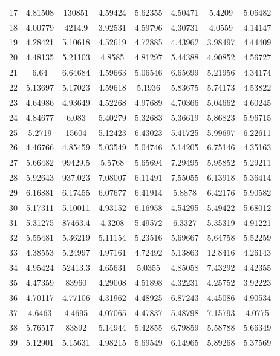 \begin{figure}
\begin{tabular}{cccccccc}
17 & 4.81508 & 130851 & 4.59424 & 5.62355 & 4.50471 & 5.4209 & 5.06482\\
18 & 4.00779 & 4214.9 & 3.92531 & 4.59796 & 4.30731 & 4.0559 & 4.14147\\
19 & 4.28421 & 5.10618 & 4.52619 & 4.72885 & 4.43962 & 3.98497 & 4.44409\\
20 & 4.48135 & 5.21103 & 4.8585 & 4.81297 & 5.44388 & 4.90852 & 4.56727\\
21 & 6.64 & 6.64684 & 4.59663 & 5.06546 & 6.65699 & 5.21956 & 4.34174\\
22 & 5.13697 & 5.17023 & 4.59618 & 5.1936 & 5.83675 & 5.74173 & 4.53822\\
23 & 4.64986 & 4.93649 & 4.52268 & 4.97689 & 4.70366 & 5.04662 & 4.60245\\
24 & 4.84677 & 6.083 & 5.40279 & 5.32683 & 5.36619 & 5.86823 & 5.96715\\
25 & 5.2719 & 15604 & 5.12423 & 6.43023 & 5.41725 & 5.99697 & 6.22611\\
26 & 4.46766 & 4.85459 & 5.03549 & 5.04746 & 5.14205 & 6.75146 & 4.35163\\
27 & 5.66482 & 99429.5 & 5.5768 & 5.65694 & 7.29495 & 5.95852 & 5.29211\\
28 & 5.92643 & 937.023 & 7.08007 & 6.11491 & 7.55055 & 6.13918 & 5.36414\\
29 & 6.16881 & 6.17455 & 6.07677 & 6.41914 & 5.8878 & 6.42176 & 5.90582\\
30 & 5.17311 & 5.10011 & 4.93152 & 6.16958 & 4.54295 & 5.49422 & 5.68012\\
31 & 5.31275 & 87463.4 & 4.3208 & 5.49572 & 6.3327 & 5.35319 & 4.91221\\
32 & 5.55481 & 5.36219 & 5.11154 & 5.23516 & 5.69667 & 5.64758 & 5.52259\\
33 & 4.38553 & 5.24997 & 4.97161 & 4.72492 & 5.13863 & 12.8416 & 4.26143\\
34 & 4.95424 & 52413.3 & 4.65631 & 5.0355 & 4.85058 & 7.43292 & 4.42355\\
35 & 4.47359 & 83960 & 4.29008 & 4.51898 & 4.32231 & 4.25752 & 3.92223\\
36 & 4.70117 & 4.77106 & 4.31962 & 4.48925 & 6.87243 & 4.45086 & 4.90534\\
37 & 4.6463 & 4.4695 & 4.07065 & 4.47837 & 5.48798 & 7.15793 & 4.0775\\
38 & 5.76517 & 83892 & 5.14944 & 5.42855 & 6.79859 & 5.58788 & 5.66349\\
39 & 5.12901 & 5.15631 & 4.98215 & 5.69549 & 6.14965 & 5.89268 & 5.37569\\

\end{tabular}
\end{figure}
